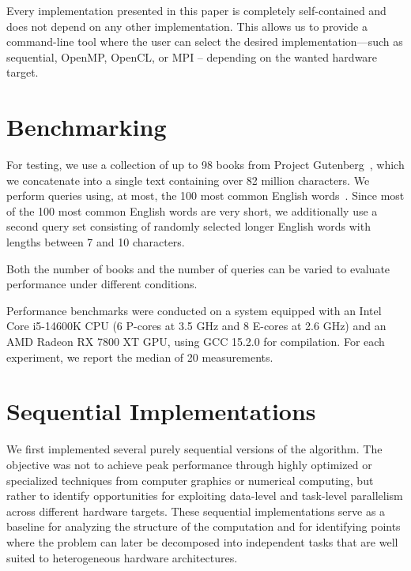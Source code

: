 \documentclass{article}
\begin{document}
    Every implementation presented in this paper is completely self-contained and does not depend on any other implementation.
    This allows us to provide a command-line tool where the user can select the desired implementation—such as sequential, OpenMP, OpenCL, or MPI -- depending on the wanted hardware target.


    \section{Benchmarking}
    For testing, we use a collection of up to 98 books from Project Gutenberg\footnotemark~\cite{gutenberg}, which we concatenate into a single text containing over 82 million characters.
    We perform queries using, at most, the 100 most common English words~\cite{common-words}.
    Since most of the 100 most common English words are very short, we additionally use a second query set consisting of randomly selected longer English words with lengths between 7 and 10 characters\footnotemark.

    Both the number of books and the number of queries can be varied to evaluate performance under different conditions.

    Performance benchmarks were conducted on a system equipped with an Intel Core i5-14600K CPU (6 P-cores at 3.5 GHz and 8 E-cores at 2.6 GHz) and an AMD Radeon RX 7800 XT GPU, using GCC 15.2.0 for compilation.
    For each experiment, we report the median of 20 measurements.


    \section{Sequential Implementations}
    We first implemented several purely sequential versions of the algorithm.
    The objective was not to achieve peak performance through highly optimized or specialized techniques from computer graphics or numerical computing, but rather to identify opportunities for exploiting data-level and task-level parallelism across different hardware targets.
    These sequential implementations serve as a baseline for analyzing the structure of the computation and for identifying points where the problem can later be decomposed into independent tasks that are well suited to heterogeneous hardware architectures.
\end{document}
